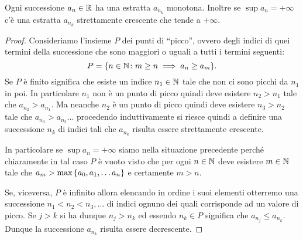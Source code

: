 \begin{lemma}%
\label{lem:estratte_monotone}%
Ogni successione $a_n\in {\mathbb R}$ ha una estratta $a_{n_k}$ monotona.
Inoltre se $\sup a_n = +\infty$ c'è una estratta $a_{n_k}$
strettamente crescente che tende a $+\infty$.
\end{lemma}
%
\begin{proof}
Consideriamo l'insieme $P$ dei punti di ``picco'', ovvero degli indici
di quei termini della successione che sono maggiori o uguali a tutti i termini
seguenti:
\[
  P = {\left\{ n\in {\mathbb N}\colon m\ge n \implies a_n\ge a_m \right\}}.
\]
Se $P$ è finito
significa che esiste un indice $n_1\in {\mathbb N}$ tale
che non ci sono picchi da $n_1$ in poi. In particolare $n_1$ non è un punto di
picco
quindi deve esistere $n_2>n_1$ tale che $a_{n_2}>a_{n_1}$.
Ma neanche $n_2$ è un punto di picco quindi deve esistere $n_3>n_2$ tale
che $a_{n_3}>a_{n_2}$... procedendo induttivamente si riesce quindi a definire
una successione $n_k$ di indici tali che $a_{n_k}$ risulta essere strettamente
crescente.

In particolare se $\sup a_n = +\infty$ siamo nella situazione precedente 
perché chiaramente in tal caso $P$ è vuoto visto che per ogni $n\in {\mathbb N}$ 
deve esistere $m\in {\mathbb N}$ tale che $a_m > \max{\left\{ a_0, a_1, \dots a_n \right\}}$
e certamente $m>n$.

Se, viceversa, $P$ è infinito allora elencando in ordine i suoi elementi otterremo
una successione $n_1 < n_2 < n_3, \dots$ di indici ognuno dei quali corrisponde ad un valore
di picco. 
Se $j>k$ si ha dunque $n_j>n_k$ ed essendo $n_k\in P$ significa che
$a_{n_j} \le a_{n_k}$. 
Dunque la successione $a_{n_k}$ risulta essere decrescente.
\end{proof}


